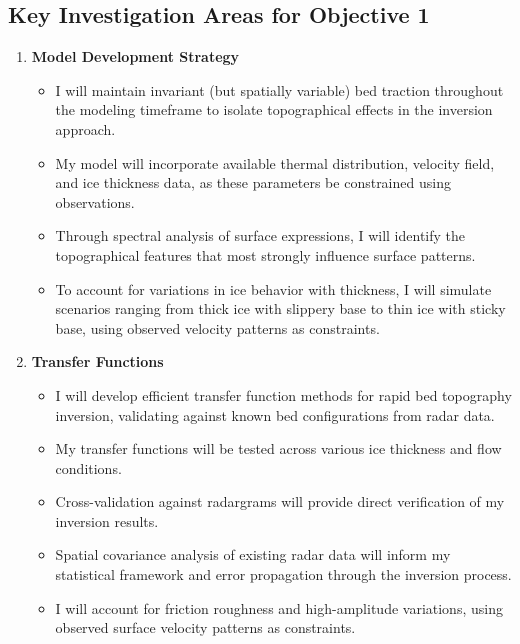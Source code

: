 \subsection*{Key Investigation Areas for Objective 1}
\begin{enumerate}
\item\textbf{Model Development Strategy}
    \begin{itemize}
    \item I will maintain invariant (but spatially variable) bed traction throughout the modeling timeframe to isolate topographical effects in the inversion approach.
    
    \item My model will incorporate available thermal distribution, velocity field, and ice thickness data, as these parameters be constrained using observations.
    
    \item Through spectral analysis of surface expressions, I will identify the topographical features that most strongly influence surface patterns.
    
    \item To account for variations in ice behavior with thickness, I will simulate scenarios ranging from thick ice with slippery base to thin ice with sticky base, using observed velocity patterns as constraints.
    \end{itemize}

\item\textbf{Transfer Functions}
    \begin{itemize}
    \item I will develop efficient transfer function methods for rapid bed topography inversion, validating against known bed configurations from radar data.
    
    \item My transfer functions will be tested across various ice thickness and flow conditions.
    
    \item Cross-validation against radargrams will provide direct verification of my inversion results.
    
    \item Spatial covariance analysis of existing radar data will inform my statistical framework and error propagation through the inversion process.
    
    \item I will account for friction roughness and high-amplitude variations, using observed surface velocity patterns as constraints.
    \end{itemize}


\end{enumerate}
